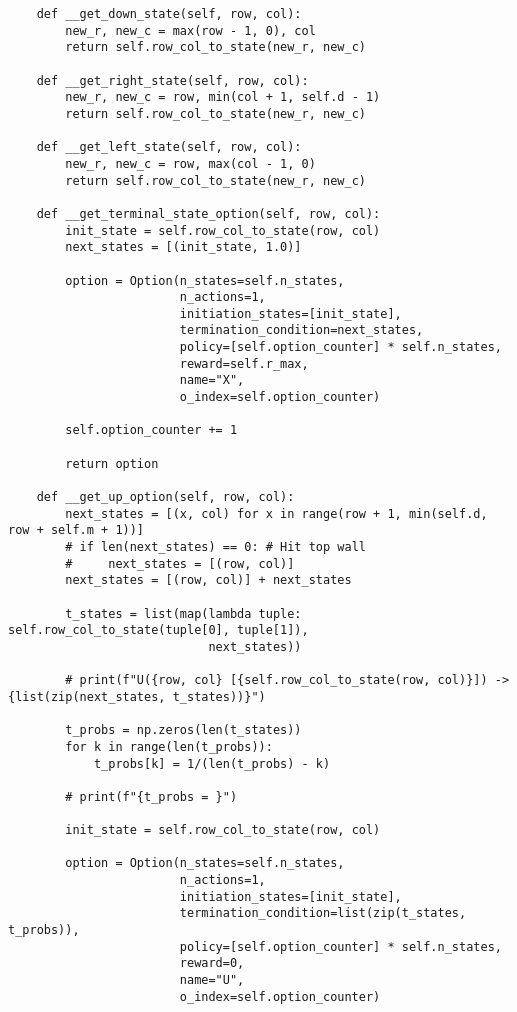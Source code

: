 \begin{verbatim}
    def __get_down_state(self, row, col):
        new_r, new_c = max(row - 1, 0), col
        return self.row_col_to_state(new_r, new_c)

    def __get_right_state(self, row, col):
        new_r, new_c = row, min(col + 1, self.d - 1)
        return self.row_col_to_state(new_r, new_c)

    def __get_left_state(self, row, col):
        new_r, new_c = row, max(col - 1, 0)
        return self.row_col_to_state(new_r, new_c)

    def __get_terminal_state_option(self, row, col):
        init_state = self.row_col_to_state(row, col)
        next_states = [(init_state, 1.0)]

        option = Option(n_states=self.n_states,
                        n_actions=1,
                        initiation_states=[init_state],
                        termination_condition=next_states,
                        policy=[self.option_counter] * self.n_states,
                        reward=self.r_max,
                        name="X",
                        o_index=self.option_counter)

        self.option_counter += 1

        return option

    def __get_up_option(self, row, col):
        next_states = [(x, col) for x in range(row + 1, min(self.d, row + self.m + 1))]
        # if len(next_states) == 0: # Hit top wall
        #     next_states = [(row, col)]
        next_states = [(row, col)] + next_states

        t_states = list(map(lambda tuple: self.row_col_to_state(tuple[0], tuple[1]),
                            next_states))

        # print(f"U({row, col} [{self.row_col_to_state(row, col)}]) -> {list(zip(next_states, t_states))}")

        t_probs = np.zeros(len(t_states))
        for k in range(len(t_probs)):
            t_probs[k] = 1/(len(t_probs) - k)

        # print(f"{t_probs = }")

        init_state = self.row_col_to_state(row, col)

        option = Option(n_states=self.n_states,
                        n_actions=1,
                        initiation_states=[init_state],
                        termination_condition=list(zip(t_states, t_probs)),
                        policy=[self.option_counter] * self.n_states,
                        reward=0,
                        name="U",
                        o_index=self.option_counter)


\end{verbatim}

